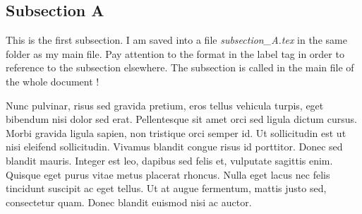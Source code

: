 \subsection{Subsection A}
\label{subsec:A} 

This is the first subsection. I am saved into a file \textit{subsection\_A.tex} in the same folder as my main file. Pay attention to the format in the label tag in order to reference to the subsection elsewhere. The subsection is called in the main file of the whole document !

\medskip Nunc pulvinar, risus sed gravida pretium, eros tellus vehicula turpis, eget bibendum nisi dolor sed erat. Pellentesque sit amet orci sed ligula dictum cursus. Morbi gravida ligula sapien, non tristique orci semper id. Ut sollicitudin est ut nisi eleifend sollicitudin. Vivamus blandit congue risus id porttitor. Donec sed blandit mauris. Integer est leo, dapibus sed felis et, vulputate sagittis enim. Quisque eget purus vitae metus placerat rhoncus. Nulla eget lacus nec felis tincidunt suscipit ac eget tellus. Ut at augue fermentum, mattis justo sed, consectetur quam. Donec blandit euismod nisi ac auctor.